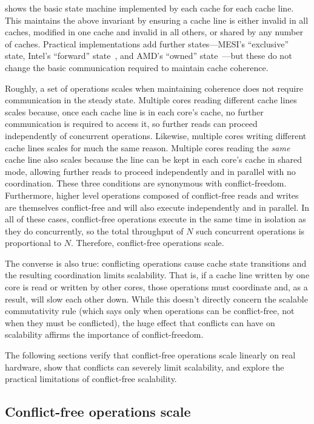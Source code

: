  shows the basic state machine implemented by each
cache for each cache line.  This maintains the above invariant by
ensuring a cache line is either invalid in all caches, modified in one
cache and invalid in all others, or shared by any number of caches.
Practical implementations add further states---MESI's ``exclusive''
state, Intel's ``forward'' state~\cite{goodman:mesif}, and AMD's
``owned'' state~\cite[\S7.3]{amd-arch-2}---but these do not change the
basic communication required to maintain cache coherence.

Roughly, a set of operations scales when maintaining coherence does
not require communication in the steady state.
%
Multiple cores reading different cache lines scales because, once each
cache line is in each core's cache, no further communication is
required to access it, so further reads can proceed independently of
concurrent operations.
%
Likewise, multiple cores writing different cache lines scales for much
the same reason.
%
Multiple cores reading the \emph{same} cache line also scales because
the line can be kept in each core's cache in shared mode, allowing
further reads to proceed independently and in parallel with no
coordination.
%
These three conditions are synonymous with conflict-freedom.
%
Furthermore, higher level operations composed of conflict-free reads
and writes are
themselves conflict-free and will also execute independently and in
parallel.
%
In all of these cases, conflict-free operations execute in the same
time in isolation as they do concurrently, so the total throughput of
$N$ such concurrent operations is proportional to $N$.  Therefore,
conflict-free operations scale.

The converse is also true: conflicting operations cause
cache state transitions and the resulting coordination limits
scalability.
%
That is, if a cache line written by one core is read or written by
other cores, those operations must
coordinate and, as a result, will slow each other down.  While this
doesn't directly concern the scalable commutativity rule (which says
only when operations can be conflict-free, not when they must be
conflicted), the huge effect that conflicts can have on scalability
affirms the importance of conflict-freedom.

The following sections verify that conflict-free operations scale
linearly on real hardware, show that conflicts can severely limit
scalability, and explore
the practical limitations of conflict-free scalability.


\subsection{Conflict-free operations scale}
\label{sec:scalability:conflict-free}

